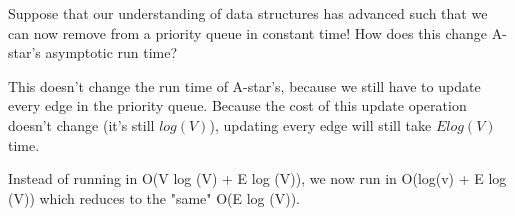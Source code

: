
\question Suppose that our understanding of data structures has advanced such that we can now remove from a priority queue in constant time! How does this change A-star’s asymptotic run time?

\begin{solution}

This doesn’t change the run time of A-star’s, because we still have to update every edge in the priority queue. Because the cost of this update operation doesn’t change (it’s still $log(V)$), updating every edge will still take $Elog(V)$ time. 

Instead of running in O(V log (V) + E log (V)), we now run in O(log(v) + E log (V)) which reduces to the "same" O(E log (V)).

\end{solution}
